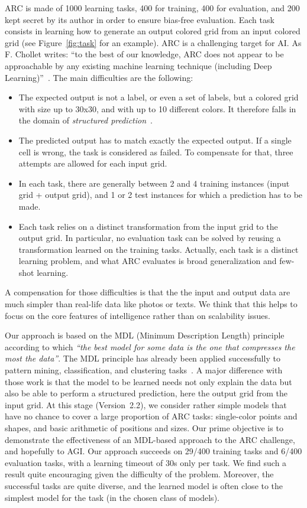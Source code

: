 \documentclass[a4paper]{llncs}
\begin{document}
ARC is made of 1000 learning tasks, 400 for training, 400 for
evaluation, and 200 kept secret by its author in order to ensure
bias-free evaluation. Each task consists in learning how to generate
an output colored grid from an input colored grid (see
Figure~\ref{fig:task} for an example).
%
ARC is a challenging target for AI. As F. Chollet writes: ``to the
best of our knowledge, ARC does not appear to be approachable by any
existing machine learning technique (including Deep
Learning)''~\cite{Chollet2019}. The main difficulties are the
following:
\begin{itemize}
\item The expected output is not a label, or even a set of labels, but
  a colored grid with size up to 30x30, and with up to 10 different
  colors. It therefore falls in the domain of {\em structured
    prediction}~\cite{dietterich2008structured}.
\item The predicted output has to match exactly the expected
  output. If a single cell is wrong, the task is considered as
  failed. To compensate for that, three attempts are allowed for each
  input grid.
\item In each task, there are generally between 2 and 4 training
  instances (input grid + output grid), and 1 or 2 test instances for
  which a prediction has to be made.
\item Each task relies on a distinct transformation from the input
  grid to the output grid. In particular, no evaluation task can be
  solved by reusing a transformation learned on the training
  tasks. Actually, each task is a distinct learning problem, and what
  ARC evaluates is broad generalization and few-shot learning.
\end{itemize}
A compensation for those difficulties is that the the input and output
data are much simpler than real-life data like photos or texts. We
think that this helps to focus on the core features of intelligence
rather than on scalability issues.

Our approach is based on the MDL (Minimum Description Length)
principle~\cite{Rissanen1978,Grunwald2019} according to which {\em ``the best
model for some data is the one that compresses the most the data''}.
%
The MDL principle has already been applied successfully to pattern
mining, classification, and clustering tasks~\cite{KRIMP2011}.
%
A major difference with those work is that the model to be learned
needs not only explain the data but also be able to perform a
structured prediction, here the output grid from the input grid.
%
At this stage (Version~2.2), we consider rather simple models that have
no chance to cover a large proportion of ARC tasks: single-color
points and shapes, and basic arithmetic of positions and sizes. Our
prime objective is to demonstrate the effectiveness of an MDL-based
approach to the ARC challenge, and hopefully to AGI. Our approach
succeeds on 29/400 training tasks and 6/400 evaluation tasks, with a
learning timeout of 30s only per task. We find such a result quite
encouraging given the difficulty of the problem. Moreover, the
successful tasks are quite diverse, and the learned model is often
close to the simplest model for the task (in the chosen class of
models).
\end{document}
